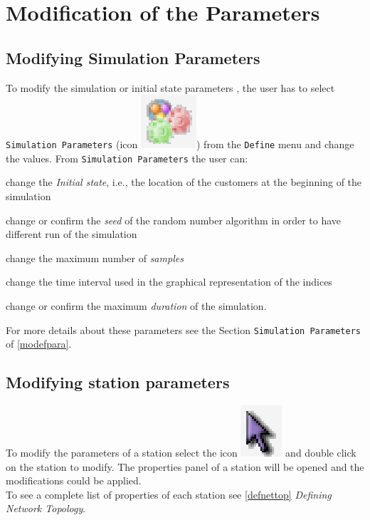 \section{Modification of the Parameters}
\label{modifpa}

\subsection{Modifying Simulation Parameters}
To modify the simulation or initial state parameters , the user
has to select \texttt{Simulation Parameters} (icon
\includegraphics[scale=.4]{img/jsimg/defineSimulationParameters.eps})
from the \texttt{Define} menu and change the values. From
\texttt{Simulation Parameters} the user can:
\begin{enumerate*} \item change the \emph{Initial state}, i.e., the location
of the customers at the beginning of the simulation \item change
or confirm the \emph{seed} of the random number algorithm in order
to have different run of the simulation \item change the maximum
number of \emph{samples} \item change the time interval used in
the graphical representation of the indices \item change or
confirm the maximum \emph{duration} of the simulation.
\end{enumerate*}

\noindent For more details about these parameters see the Section
\texttt{Simulation Parameters} of \autoref{modefpara}.

\subsection{Modifying station parameters}
 To modify the
parameters of a station select the icon
\includegraphics[scale=.5]{img/jsimg/select} and double
click on the station to modify. The properties panel of a station
will be opened and the modifications could be applied.\\
To see a complete list of properties of each station see
\autoref{defnettop} \emph{Defining Network Topology}.


